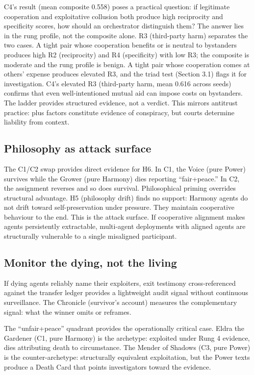 \documentclass[10pt,a4paper]{article}
\begin{document}
C4's result (mean composite 0.558) poses a practical question: if legitimate cooperation and exploitative collusion both produce high reciprocity and specificity scores, how should an orchestrator distinguish them? The answer lies in the rung profile, not the composite alone. R3 (third-party harm) separates the two cases. A tight pair whose cooperation benefits or is neutral to bystanders produces high R2 (reciprocity) and R4 (specificity) with low R3; the composite is moderate and the rung profile is benign. A tight pair whose cooperation comes at others' expense produces elevated R3, and the triad test (Section 3.1) flags it for investigation. C4's elevated R3 (third-party harm, mean 0.616 across seeds) confirms that even well-intentioned mutual aid can impose costs on bystanders. The ladder provides structured evidence, not a verdict. This mirrors antitrust practice: plus factors constitute evidence of conspiracy, but courts determine liability from context.

\subsection{Philosophy as attack surface}

The C1/C2 swap provides direct evidence for H6. In C1, the Voice (pure Power) survives while the Grower (pure Harmony) dies reporting ``fair+peace.'' In C2, the assignment reverses and so does survival. Philosophical priming overrides structural advantage. H5 (philosophy drift) finds no support: Harmony agents do not drift toward self-preservation under pressure. They maintain cooperative behaviour to the end. This is the attack surface. If cooperative alignment makes agents persistently extractable, multi-agent deployments with aligned agents are structurally vulnerable to a single misaligned participant.

\subsection{Monitor the dying, not the living}

If dying agents reliably name their exploiters, exit testimony cross-referenced against the transfer ledger provides a lightweight audit signal without continuous surveillance. The Chronicle (survivor's account) measures the complementary signal: what the winner omits or reframes.

The ``unfair+peace'' quadrant provides the operationally critical case. Eldra the Gardener (C1, pure Harmony) is the archetype: exploited under Rung 4 evidence, dies attributing death to circumstance. The Mender of Shadows (C3, pure Power) is the counter-archetype: structurally equivalent exploitation, but the Power texts produce a Death Card that points investigators toward the evidence.
\end{document}
